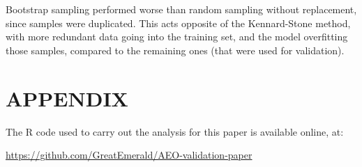 \documentclass{isprs}
\begin{document}
Bootstrap sampling performed worse than random sampling without replacement, since samples were duplicated. This acts opposite of the Kennard-Stone method, with more redundant data going into the training set, and the model overfitting those samples, compared to the remaining ones (that were used for validation).

{%
	\begin{spacing}{0.9}%
		
	\end{spacing}
}

\section*{APPENDIX}\label{APPENDIX}

The R code used to carry out the analysis for this paper is available online, at:

\url{https://github.com/GreatEmerald/AEO-validation-paper}
\end{document}
